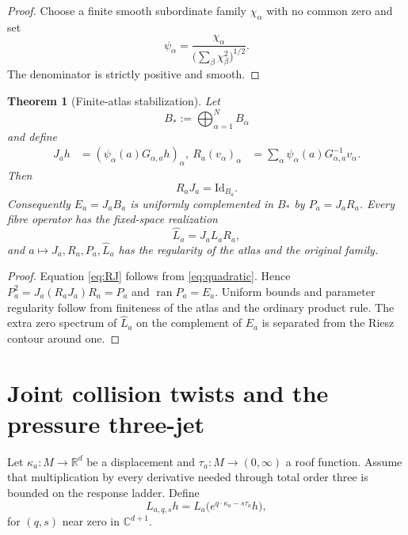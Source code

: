 \documentclass[11pt,reqno]{amsart}
\newtheorem{theorem}{Theorem}[section]
\theoremstyle{definition}
\theoremstyle{remark}
\newcommand{\C}{\mathbb C}
\newcommand{\R}{\mathbb R}
\newcommand{\Id}{\mathrm{Id}}
\begin{document}
\begin{proof}
Choose a finite smooth subordinate family $\chi_\alpha$ with no common zero
and set
\[
 \psi_\alpha=\frac{\chi_\alpha}
 {\bigl(\sum_\beta\chi_\beta^2\bigr)^{1/2}}.
\]
The denominator is strictly positive and smooth.
\end{proof}

\begin{theorem}[Finite-atlas stabilization]\label{thm:stabilization}
Let
\[
 B_*:=\bigoplus_{\alpha=1}^N B_\alpha
\]
and define
\begin{align}
 J_a h&=(\psi_\alpha(a)G_{\alpha,a}h)_\alpha,
 \label{eq:Ja}\
 R_a(v_\alpha)_\alpha
 &=\sum_\alpha\psi_\alpha(a)G_{\alpha,a}^{-1}v_\alpha.
 \label{eq:Ra}
\end{align}
Then
\begin{equation}\label{eq:RJ}
 R_aJ_a=\Id_{B_a}.
\end{equation}
Consequently $E_a=J_aB_a$ is uniformly complemented in $B_*$ by
$P_a=J_aR_a$.  Every fibre operator has the fixed-space realization
\begin{equation}\label{eq:Lhat}
 \widehat L_a=J_aL_aR_a,
\end{equation}
and $a\mapsto J_a,R_a,P_a,\widehat L_a$ has the regularity of the atlas and the
original family.
\end{theorem}

\begin{proof}
Equation \eqref{eq:RJ} follows from \eqref{eq:quadratic}.  Hence
$P_a^2=J_a(R_aJ_a)R_a=P_a$ and $\operatorname{ran}P_a=E_a$.  Uniform bounds and
parameter regularity follow from finiteness of the atlas and the ordinary
product rule.  The extra zero spectrum of $\widehat L_a$ on the complement of
$E_a$ is separated from the Riesz contour around one.
\end{proof}

\section{Joint collision twists and the pressure three-jet}\label{sec:pressure}

Let $\kappa_a:M\to\R^d$ be a displacement and $\tau_a:M\to(0,\infty)$ a roof
function.  Assume that multiplication by every derivative needed through total
order three is bounded on the response ladder.  Define
\begin{equation}\label{eq:twisted}
 L_{a,q,s}h=L_a\bigl(e^{q\cdot\kappa_a-s\tau_a}h\bigr),
\end{equation}
for $(q,s)$ near zero in $\C^{d+1}$.
\end{document}
